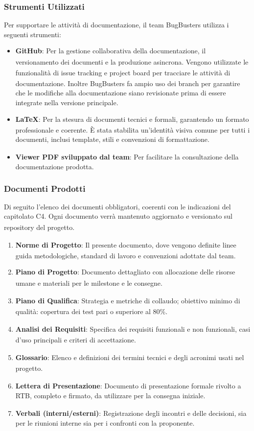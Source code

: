 \documentclass[a4paper,11pt]{article}
\newcommand{\G}{\textsubscript{\scalebox{0.6}{\textbf{G}}}}
\begin{document}
\subsubsection{Strumenti Utilizzati}
Per supportare le attività di documentazione, il team BugBusters utilizza i seguenti strumenti:
\begin{itemize}
    \item \textbf{GitHub\G{}}: Per la gestione collaborativa della documentazione, il versionamento\G{} dei documenti e la produzione asincrona. 
    Vengono utilizzate le funzionalità\G{} di issue\G{} tracking e project board per tracciare le attività di documentazione. 
    Inoltre BugBusters fa ampio uso dei branch per garantire che le modifiche alla documentazione siano revisionate 
    prima di essere integrate nella versione principale.
    \item \textbf{LaTeX\G{}}: Per la stesura di documenti tecnici e formali, garantendo un formato professionale e coerente. È stata stabilita
    un'identità visiva comune per tutti i documenti, inclusi template\G{}, stili e convenzioni di formattazione.
    \item \textbf{Viewer PDF sviluppato dal team}: Per facilitare la consultazione della documentazione prodotta.
\end{itemize}

\subsubsection{Documenti Prodotti}
Di seguito l'elenco dei documenti obbligatori, coerenti con le indicazioni del capitolato\G{} C4. Ogni documento verrà mantenuto aggiornato e versionato sul repository\G{} del progetto\G{}.

\begin{enumerate}
    \item \textbf{Norme di Progetto\G{}}: Il presente documento, dove vengono definite linee guida metodologiche, standard di lavoro e convenzioni adottate dal team.
    \item \textbf{Piano di Progetto\G{}}: Documento dettagliato con allocazione delle risorse umane e materiali per le milestone\G{} e le consegne.
    \item \textbf{Piano di Qualifica\G{}}: Strategia e metriche di collaudo; obiettivo minimo di qualità\G{}: copertura dei test\G{} pari o superiore al 80\%.
    \item \textbf{Analisi dei Requisiti\G{}}: Specifica dei requisiti\G{} funzionali\G{} e non funzionali\G{}, casi d'uso\G{} principali e criteri di accettazione.
    \item \textbf{Glossario\G{}}: Elenco e definizioni dei termini tecnici e degli acronimi usati nel progetto\G{}.
    \item \textbf{Lettera di Presentazione}: Documento di presentazione formale rivolto a RTB\G{}, completo e firmato, da utilizzare per la consegna iniziale.
    \item \textbf{Verbali (interni/esterni)}: Registrazione degli incontri e delle decisioni, sia per le riunioni interne sia per i confronti con la proponente\G{}.
\end{enumerate}
\end{document}
